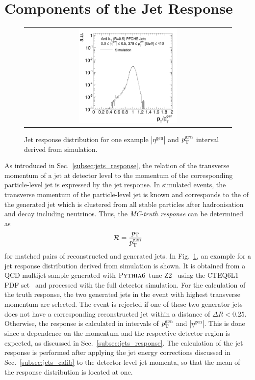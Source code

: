 \section{Components of the Jet Response}
\label{sec:jer_response}
\begin{figure}[!tp]
  \centering
  \begin{tabular}{c}
                \includegraphics[width=0.49\textwidth]{figures/TruthResponse_example_test.pdf}
  \end{tabular}
  \caption{Jet response distribution for one example $|\eta^\mathrm{gen}|$ and $p_{\text{T}}^\mathrm{gen}$ interval derived from simulation.}
  \label{fig:response}
\end{figure}
As introduced in Sec.~\ref{subsec:jets_response}, the relation of the transverse momentum of a jet at detector level to the momentum of the corresponding particle-level jet is expressed by the jet response. In simulated events, the transverse momentum of the particle-level jet is known and corresponds to the \pt of the generated jet which is clustered from all stable particles after hadronisation and decay including neutrinos. Thus, the \textit{MC-truth response} can be determined as
\begin{equation}
\mathcal{R} = \frac{p_{\text{T}}}{p_{\text{T}}^{\mathrm{gen}}} 
\end{equation}
for matched pairs of reconstructed and generated jets. In Fig.~\ref{fig:response}, an example for a jet response distribution derived from simulation is shown. It is obtained from a QCD multijet sample generated with $\textsc{Pythia6}$ tune Z2~\cite{Chatrchyan:2011id} using the CTEQ6L1 PDF set~\cite{Pumplin:2002vw} and processed with the full detector simulation. For the calculation of the truth response, the two generated jets in the event with highest transverse momentum are selected. The event is rejected if one of these two generator jets does not have a corresponding reconstructed jet within a distance of $\Delta R < 0.25$. Otherwise, the response is calculated in intervals of $p_{\text{T}}^\mathrm{gen}$ and $|\eta^\mathrm{gen}|$. This is done since a dependence on the momentum and the respective detector region is expected, as discussed in Sec.~\ref{subsec:jets_response}. The calculation of the jet response is performed after applying the jet energy corrections discussed in Sec.~\ref{subsec:jets_calib} to the detector-level jet momenta, so that the mean of the response distribution is located at one. \\
